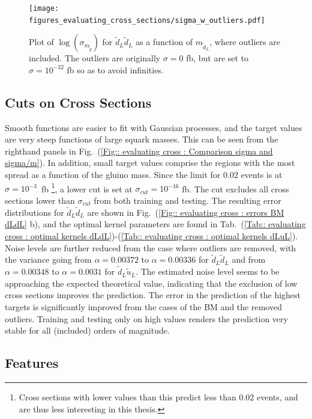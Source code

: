 \documentclass[twoside,english]{uiofysmaster}
\begin{document}
\begin{figure}
\centering
\texttt{[image: figures\_evaluating\_cross\_sections/sigma\_w\_outliers.pdf]}
\caption{Plot of $\log( \sigma_{m_{\tilde{g}}})$ for $\tilde{d}_L \tilde{d}_L$ as a function of $m_{\tilde{d}_L}$, where outliers are included. The outliers are originally $\sigma=0$ fb, but are set to $\sigma =10^{-32}$ fb so as to avoid infinities.}
\label{Fig:: evaluating cross : sigma w outliers}
\end{figure}

\subsection{Cuts on Cross Sections}

Smooth functions are easier to fit with Gaussian processes, and the target values are very steep functions of large squark masses. This can be seen from the righthand panels in Fig.\ (\ref{Fig:: evaluating cross : Comparison sigma and sigma/m}). In addition, small target values comprise the regions with the most spread as a function of the gluino mass. Since the limit for $0.02$ events is at $\sigma = 10^{-3}$~fb \footnote{Cross sections with lower values than this predict less than 0.02 events, and are thus less interesting in this thesis.}, a lower cut is set at $\sigma_{cut} = 10^{-16}$ fb. The cut excludes all cross sections lower than $\sigma_{cut}$ from both training and testing. The resulting error distributions for $\tilde{d}_L \tilde{d}_L$ are shown in Fig.\ (\ref{Fig:: evaluating cross : errors BM dLdL} b), and the optimal kernel parameters are found in Tab.\ (\ref{Tab:: evaluating cross : optimal kernels dLdL})-(\ref{Tab:: evaluating cross : optimal kernels dLuL}). Noise levels are further reduced from the case where outliers are removed, with the variance going from $\alpha=0.00372$ to $\alpha = 0.00336$ for $\tilde{d}_L \tilde{d}_L$ and from $\alpha=0.00348$ to $\alpha=0.0031$ for $\tilde{d}_L \tilde{u}_L$. The estimated noise level seems to be approaching the expected theoretical value, indicating that the exclusion of low cross sections improves the prediction. The error in the prediction of the highest targets is significantly improved from the cases of the BM and the removed outliers. Training and testing only on high values renders the prediction very stable for all (included) orders of magnitude.

\subsection{Features}
\end{document}

